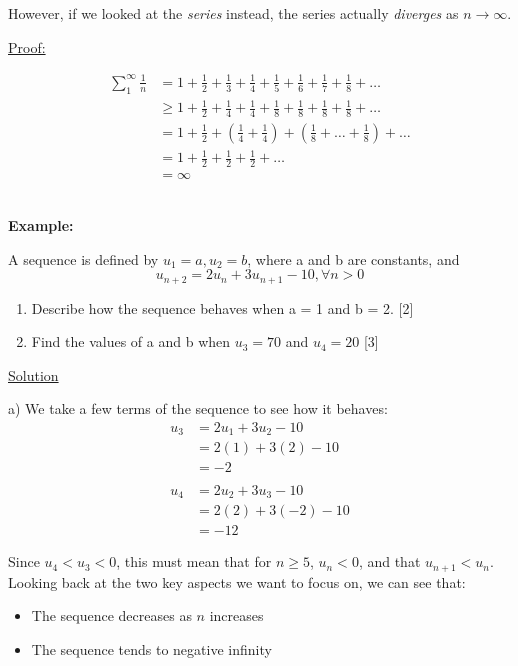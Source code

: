 \documentclass[12pt, a4paper, titlepage]{article}
\begin{document}
However, if we looked at the \emph{series} instead, the series actually \emph{diverges} as $n \rightarrow \infty$.

\underline{Proof:}

\begin{align*}
    \sum_1^{\infty} \frac{1}{n} &= 1 + \frac{1}{2} + \frac{1}{3} + \frac{1}{4} + \frac{1}{5} + \frac{1}{6} + \frac{1}{7} + \frac{1}{8} + \dots \\
    &\ge 1 + \frac{1}{2} + \frac{1}{4} + \frac{1}{4} + \frac{1}{8} + \frac{1}{8} + \frac{1}{8} + \frac{1}{8} + \dots \\
    &= 1 + \frac{1}{2} + (\frac{1}{4} + \frac{1}{4}) + (\frac{1}{8} + \dots + \frac{1}{8}) + \dots \\
    &= 1 + \frac{1}{2} + \frac{1}{2} + \frac{1}{2} + \dots \\
    &= \infty
\end{align*}

\textbf{\\ Example:}

A sequence is defined by $u_1 = a, u_2 = b$, where a and b are constants, and
\begin{equation*}
    u_{n+2} = 2u_n + 3u_{n+1} - 10, \forall n > 0
\end{equation*}
\begin{enumerate}[label=(\alph*)]
    \item Describe how the sequence behaves when a = 1 and b = 2. [2]
    \item Find the values of a and b when $u_3 = 70$ and $u_4 = 20$ [3]
\end{enumerate}

\begin{flushright}
\end{flushright}

\underline{Solution}

a) We take a few terms of the sequence to see how it behaves:
\begin{align*}
    u_3 &= 2u_1 + 3u_2 - 10 \\
    &= 2(1) + 3(2) - 10 \\
    &= -2 \\ \\
    u_4 &= 2u_2 + 3u_3 - 10 \\
    &= 2(2) + 3(-2) - 10 \\
    &= -12
\end{align*}

Since $u_4 < u_3 < 0$, this must mean that for $n \ge 5$, $u_n < 0$, and that $u_{n+1} < u_{n}$. Looking back at the two key aspects we want to focus on, we can see that:
\begin{itemize}
    \item The sequence decreases as $n$ increases
    \item The sequence tends to negative infinity
\end{itemize}
\end{document}
